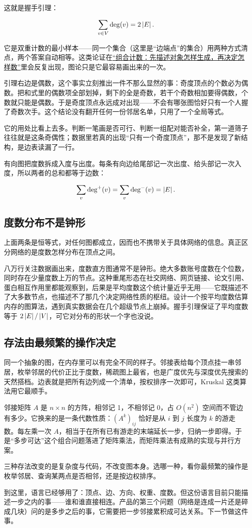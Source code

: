 这就是握手引理：

\[
\sum_{v\in V}\deg(v)=2\left|E\right|.
\]

它是双重计数的最小样本——同一个集合（这里是``边端点''的集合）用两种方式清点，两个答案自动相等。这类论证在\hyperref[ch:026]{``组合计数：先描述对象怎样生成，再决定怎样数''}里会反复出现，图论只是它最容易画出来的一次。

引理右边是偶数，这个事实立刻推出一件不那么显然的事：奇度顶点的个数必为偶数。把和式里的偶数项全部划掉，剩下的全是奇数，若干个奇数相加要得偶数，个数就只能是偶数。于是奇度顶点永远成对出现——不会有哪张图恰好只有一个人握了奇数次手。这个结论没有翻开任何一份邻居名单，只用了一个全局等式。

它的用处比看上去多。判断一笔画是否可行、判断一组配对能否补全，第一道筛子往往就是这条奇偶性；数据里若真的出现``只有一个奇度顶点''，那不是发现了新结构，是边表读漏了一行。

有向图把度数拆成入度与出度。每条有向边给尾部记一次出度、给头部记一次入度，所以两者的总和都等于边数：

\[
\sum_{v}\deg^+(v)=\sum_{v}\deg^-(v)=\left|E\right|.
\]

\subsection{度数分布不是钟形}

上面两条是恒等式，对任何图都成立，因而也不携带关于具体网络的信息。真正区分网络的是度数怎样分布在顶点之间。

八万行关注数据画出来，度数直方图通常不是钟形。绝大多数账号度数在个位数，同时存在少量度数上万的节点。这种重尾形态在社交网络、网页链接、论文引用、蛋白相互作用里都能观察到，后果是平均度数这个统计量近乎无用——它既描述不了大多数节点，也描述不了那几个决定网络性质的枢纽。设计一个按平均度数估算内存的图算法，遇到真实数据会在几个超级节点上崩掉。握手引理保证了平均度数等于 \(2\left|E\right|/\left|V\right|\)，可它对分布的形状一个字也没说。

\subsection{存法由最频繁的操作决定}

同一个抽象的图，在内存里可以有完全不同的样子。邻接表给每个顶点挂一串邻居，枚举邻居的代价正比于度数，稀疏图上最省，也是广度优先与深度优先搜索的天然搭档。边表就是把所有边列成一个清单，按权排序一次即可，Kruskal 这类算法用它最顺手。

邻接矩阵 \(A\) 是 \(n\times n\) 的方阵，相邻记 1，不相邻记 0，占 \(O(n^2)\) 空间而不管边有多少。它换来的是一条代数性质：\((A^k)_{ij}\) 恰好是从 \(i\) 到 \(j\) 长度为 \(k\) 的游走数。每左乘一次 \(A\)，相当于在所有已有游走的末端延长一步，归纳一步即得。于是``多步可达''这个组合问题落进了矩阵乘法，而矩阵乘法有成熟的实现与并行方案。

三种存法改变的是复杂度与代码，不改变图本身。选哪一种，看你最频繁的操作是枚举邻居、查询某两点是否相邻，还是按边权排序。

到这里，语言已经够用了：顶点、边、方向、权重、度数。但这份语言目前只能描述一步之内的事——谁和谁直接相连。产品的第三个问题（网络是连成一片还是碎成几块）问的是多步之后的事，它需要把一步邻接累积成可达关系。下一节做这件事。

